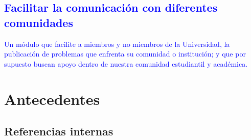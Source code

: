 \documentclass[11pt,letterpaper,titlepage]{article}
\begin{document}
\textcolor{blue}{
\subsection{Facilitar la comunicaci\'on con diferentes comunidades}
Un m\'odulo que facilite a miembros y no miembros de la Universidad, la publicaci\'on de problemas que enfrenta su comunidad o instituci\'on; y que por supuesto buscan apoyo dentro de nuestra comunidad estudiantil y acad\'emica. }


\section{Antecedentes}
\subsection{Referencias internas}
\end{document}
